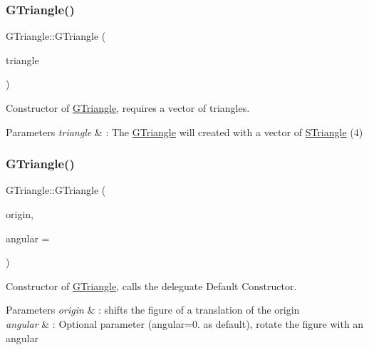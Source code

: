 \subsubsection{\texorpdfstring{G\+Triangle()}{GTriangle()}\hspace{0.1cm}{\footnotesize\ttfamily [1/2]}}
{\footnotesize\ttfamily G\+Triangle\+::\+G\+Triangle (\begin{DoxyParamCaption}\item[{const std\+::vector$<$ \hyperlink{classSTriangle}{S\+Triangle} $>$ \&}]{triangle }\end{DoxyParamCaption})\hspace{0.3cm}{\ttfamily [explicit]}}



Constructor of \hyperlink{classGTriangle}{G\+Triangle}, requires a vector of triangles. 


\begin{DoxyParams}{Parameters}
{\em triangle} & \+: The \hyperlink{classGTriangle}{G\+Triangle} will created with a vector of \hyperlink{classSTriangle}{S\+Triangle} (4) \\
\hline
\end{DoxyParams}
\mbox{\label{classGTriangle_ae5a721f4da22b1c25d9305307d923a3e}} 
\subsubsection{\texorpdfstring{G\+Triangle()}{GTriangle()}\hspace{0.1cm}{\footnotesize\ttfamily [2/2]}}
{\footnotesize\ttfamily G\+Triangle\+::\+G\+Triangle (\begin{DoxyParamCaption}\item[{\hyperlink{classPoint}{Point}$<$ double $>$}]{origin,  }\item[{double}]{angular = {} }\end{DoxyParamCaption})\hspace{0.3cm}{\ttfamily [explicit]}}



Constructor of \hyperlink{classGTriangle}{G\+Triangle}, calls the deleguate Default Constructor. 


\begin{DoxyParams}{Parameters}
{\em origin} & \+: shifts the figure of a translation of the origin \\
\hline
{\em angular} & \+: Optional parameter (angular=0. as default), rotate the figure with an angular \\
\hline
\end{DoxyParams}


